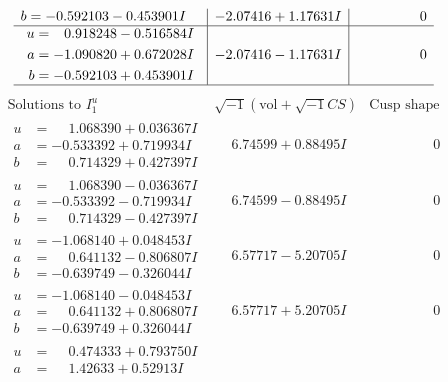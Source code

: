 \documentclass[1p]{elsarticle_modified}
\theoremstyle{definition}
\newcommand{\I}{\sqrt{-1}}
\begin{document}
$$\begin{array}{c|c|c}
\begin{aligned}
b &= -0.592103 - 0.453901 I\end{aligned}
 & -2.07416 + 1.17631 I & \phantom{-0.000000 } 0 \\ \hline\begin{aligned}
u &= \phantom{-}0.918248 - 0.516584 I \\
a &= -1.090820 + 0.672028 I \\
b &= -0.592103 + 0.453901 I\end{aligned}
 & -2.07416 - 1.17631 I & \phantom{-0.000000 } 0\\
 \hline 
 \end{array}$$\newpage$$\begin{array}{c|c|c}  
\text{Solutions to }I^u_{1}& \I (\text{vol} + \sqrt{-1}CS) & \text{Cusp shape}\\
 \hline 
\begin{aligned}
u &= \phantom{-}1.068390 + 0.036367 I \\
a &= -0.533392 + 0.719934 I \\
b &= \phantom{-}0.714329 + 0.427397 I\end{aligned}
 & \phantom{-}6.74599 + 0.88495 I & \phantom{-0.000000 } 0 \\ \hline\begin{aligned}
u &= \phantom{-}1.068390 - 0.036367 I \\
a &= -0.533392 - 0.719934 I \\
b &= \phantom{-}0.714329 - 0.427397 I\end{aligned}
 & \phantom{-}6.74599 - 0.88495 I & \phantom{-0.000000 } 0 \\ \hline\begin{aligned}
u &= -1.068140 + 0.048453 I \\
a &= \phantom{-}0.641132 - 0.806807 I \\
b &= -0.639749 - 0.326044 I\end{aligned}
 & \phantom{-}6.57717 - 5.20705 I & \phantom{-0.000000 } 0 \\ \hline\begin{aligned}
u &= -1.068140 - 0.048453 I \\
a &= \phantom{-}0.641132 + 0.806807 I \\
b &= -0.639749 + 0.326044 I\end{aligned}
 & \phantom{-}6.57717 + 5.20705 I & \phantom{-0.000000 } 0 \\ \hline\begin{aligned}
u &= \phantom{-}0.474333 + 0.793750 I \\
a &= \phantom{-}1.42633 + 0.52913 I \\

\end{aligned}
\end{array}$$
\end{document}
